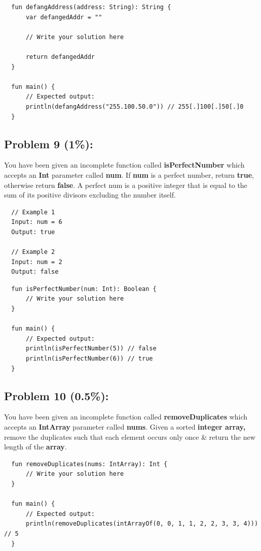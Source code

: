 \documentclass{article}
\begin{document}
\begin{verbatim}
  fun defangAddress(address: String): String {
      var defangedAddr = ""
      
      // Write your solution here
      
      return defangedAddr
  }

  fun main() {
      // Expected output:
      println(defangAddress("255.100.50.0")) // 255[.]100[.]50[.]0
  }
\end{verbatim}

\subsection*{Problem 9 (1\%):}
You have been given an incomplete function called \textbf{isPerfectNumber} which accepts an \textbf{Int} parameter called \textbf{num}. If \textbf{num} is a perfect number, return \textbf{true}, otherwise return \textbf{false}. A perfect num is a positive integer that is equal to the sum of its positive divisors excluding the number itself.

\begin{verbatim}
  // Example 1
  Input: num = 6
  Output: true

  // Example 2
  Input: num = 2
  Output: false
\end{verbatim}

\begin{verbatim}
  fun isPerfectNumber(num: Int): Boolean {
      // Write your solution here
  }

  fun main() {
      // Expected output:
      println(isPerfectNumber(5)) // false
      println(isPerfectNumber(6)) // true
  }
\end{verbatim}

\subsection*{Problem 10 (0.5\%):}
You have been given an incomplete function called \textbf{removeDuplicates} which accepts an \textbf{IntArray} parameter called \textbf{nums}. Given a sorted \textbf{integer array,} remove the duplicates such that each element occurs only once \& return the new length of the \textbf{array}.

\begin{verbatim}
  fun removeDuplicates(nums: IntArray): Int {
      // Write your solution here  
  }

  fun main() {
      // Expected output:
      println(removeDuplicates(intArrayOf(0, 0, 1, 1, 2, 2, 3, 3, 4))) // 5
  }
\end{verbatim}
\end{document}
